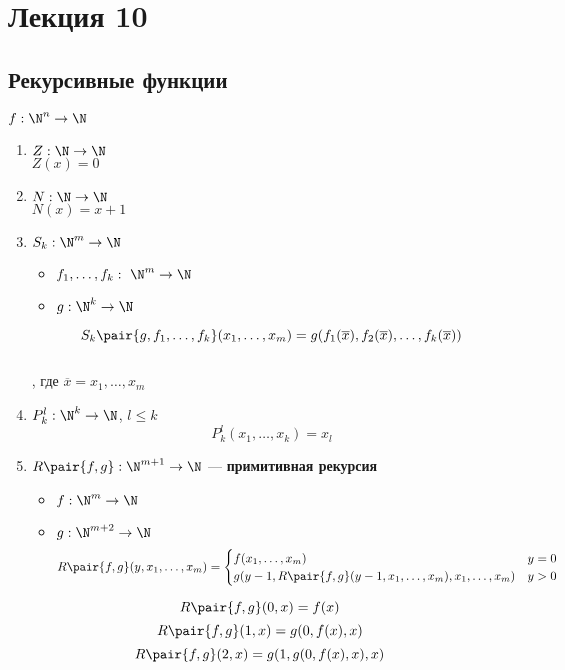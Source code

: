 \documentclass[oneside]{book}
\renewcommand{\leftmark}{}
\begin{document}
\chapter*{Лекция 10}\renewcommand{\leftmark}{Лекция 10}
\label{sec:org9620058}

\section{Рекурсивные функции}
\label{sec:org98df6c4}
\begin{definition}
	\(f: \N^n \to \N\)
	\begin{enumerate}
		\item \(Z: \N \to \N\) \\
		      \(Z(x) = 0\)
		\item \(N: \N \to \N\) \\
		      \(N(x) = x + 1\)
		\item \(S_k: \N^m \to \N\)
		      \begin{itemize}
			      \item \(f_1, \dots, f_k:\ \N^m \to \N\)
			      \item \(g: \N^k \to \N\)
		      \end{itemize}
		      \[S_k \pair{g, f_1, \dots, f_k}(x_1,\dots,x_m) = g(f_1(\overline{x}), f_2(\overline{x}),\dots,f_k(\overline{x}))\] \\
		      , где \(\overline{x} = x_1,\dots,x_m\)
		\item \(P^l_k: \N^k \to \N\), \(l \le k\)
		      \[ P^l_k(x_1, \dots, x_k) = x_l \]
		\item \(R\pair{f, g}: \N^{m + 1} \to \N\) --- \textbf{примитивная рекурсия}
		      \begin{itemize}
			      \item \(f: \N^m \to \N\)
			      \item \(g: \N^{m + 2} \to \N\)
			            \[ R\pair{f, g}(y, x_1, \dots, x_m) = \begin{cases}
					            f(x_1, \dots, x_m)                                              & y = 0 \\
					            g(y - 1, R\pair{f, g}(y - 1, x_1, \dots, x_m), x_1, \dots, x_m) & y > 0
				            \end{cases} \]
		      \end{itemize}
	\end{enumerate}
	\label{orga463e91}
\end{definition}
\begin{examp}
	\[ R\pair{f, g}(0, x) = f(x) \]
	\[ R\pair{f, g}(1, x) = g(0, f(x), x) \]
	\[ R\pair{f, g}(2, x) = g(1, g(0, f(x), x), x) \]
\end{examp}
\end{document}

